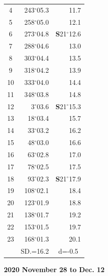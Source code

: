\documentclass[10pt, a4paper]{report}
\begin{document}
\begin{scriptsize}
\begin{tabular*}{0.2\textwidth}[t]{@{\extracolsep{\fill}}|c|rr|}
4 & 243$^\circ$05.3 & 11.7\\
5 & 258$^\circ$05.0 & 12.1\\[2Pt]
6 & 273$^\circ$04.8 & \textbf{S}21$^\circ$12.6\\
7 & 288$^\circ$04.6 & 13.0\\
8 & 303$^\circ$04.4 & 13.5\\
9 & 318$^\circ$04.2 & \raisebox{0.24ex}{\boldmath$\cdot$~\boldmath$\cdot$~~}13.9\\
10 & 333$^\circ$04.0 & 14.4\\
11 & 348$^\circ$03.8 & 14.8\\[2Pt]
12 & 3$^\circ$03.6 & \textbf{S}21$^\circ$15.3\\
13 & 18$^\circ$03.4 & 15.7\\
14 & 33$^\circ$03.2 & 16.2\\
15 & 48$^\circ$03.0 & \raisebox{0.24ex}{\boldmath$\cdot$~\boldmath$\cdot$~~}16.6\\
16 & 63$^\circ$02.8 & 17.0\\
17 & 78$^\circ$02.5 & 17.5\\[2Pt]
18 & 93$^\circ$02.3 & \textbf{S}21$^\circ$17.9\\
19 & 108$^\circ$02.1 & 18.4\\
20 & 123$^\circ$01.9 & 18.8\\
21 & 138$^\circ$01.7 & \raisebox{0.24ex}{\boldmath$\cdot$~\boldmath$\cdot$~~}19.2\\
22 & 153$^\circ$01.5 & 19.7\\
23 & 168$^\circ$01.3 & 20.1\\
\hline
\rule{0pt}{2.4ex} & \multicolumn{1}{c}{SD.=16.2} & \multicolumn{1}{c|}{d=-0.5}\\
\hline
\end{tabular*}

\end{scriptsize}
\newpage
\sffamily
\noindent
\begin{flushright}
\textbf{2020 November 28 to Dec. 12}\par
\end{flushright}
\end{document}

